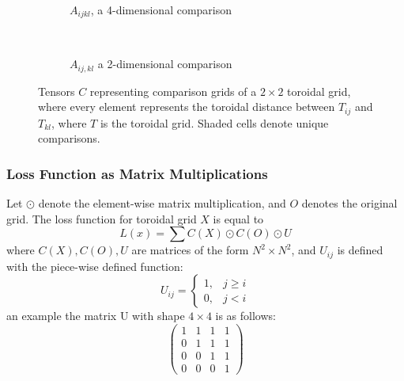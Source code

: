 \begin{figure}[htpb]
    \centering
    \begin{subfigure}[t]{0.5\textwidth}
    \begin{center}
    \end{center}
    \caption{$A_{ijkl}$, a 4-dimensional comparison}
    \label{fig:4dcomparison}
    \end{subfigure}%
    ~
    \begin{subfigure}[t]{0.5\textwidth}
    \begin{center}
    \end{center}
    \caption{$A_{ij,kl}$ a 2-dimensional comparison}
    \label{fig:2dcomparison}
    \end{subfigure}

    \caption{Tensors $C$ representing comparison grids of a $2\times 2$ toroidal grid, where every element represents the toroidal distance between $T_{ij}$ and $T_{kl}$, where $T$ is the toroidal grid. Shaded cells denote unique comparisons.}%
    \label{fig:comparisonGrids}
\end{figure}

\subsubsection{Loss Function as Matrix Multiplications}%
\label{ssub:loss_function_as_matrix_multiplications}
Let $\odot$ denote the element-wise matrix multiplication, and $O$ denotes the original grid. The loss function for toroidal grid $X$ is equal to
\begin{equation}
    L(x)=\sum C(X)\odot C(O)\odot U
\end{equation}
where $C(X),C(O),U$ are matrices of the form $N^2\times N^2$, and $U_{ij}$ is defined with the piece-wise defined function:
\begin{equation}
    U_{ij}=
    \begin{cases}
        1, & j\geq i \\
        0, & j<i
    \end{cases}
\end{equation}
an example the matrix U with shape $4\times 4$ is as follows:
 \begin{equation}
    \begin{pmatrix}
        1&1&1&1\\
        0&1&1&1\\
        0&0&1&1\\
        0&0&0&1
    \end{pmatrix}
\end{equation}

